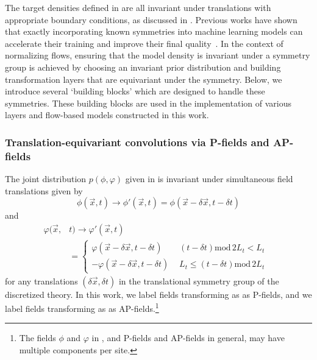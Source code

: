 \documentclass[aps,prd,twocolumn,nofootinbib,superscriptaddress,preprintnumbers]{revtex4-1}
\begin{document}
The target densities defined in  are all invariant under translations with appropriate boundary conditions, as discussed in . Previous works have shown that exactly incorporating known symmetries into machine learning models can accelerate their training and improve their final quality~\cite{cohen2016group,Cohen:2018,Cohen:2019,Tomiya:2021ywc,Bulusu:2021rqz,Favoni:2020reg}. In the context of normalizing flows, ensuring that the model density is invariant under a symmetry group is achieved by choosing an invariant prior distribution and building transformation layers that are equivariant under the symmetry.  Below, we introduce several `building blocks' which are designed to handle these symmetries. These building blocks are used in the implementation of various layers and flow-based models constructed in this work.


\subsubsection{Translation-equivariant convolutions via P-fields and AP-fields}
\label{sec:translational-sym}

The joint distribution $p(\phi,\varphi)$ given in  is invariant under simultaneous field translations given by
%
\begin{equation}
    \phi(\vec{x},t) \rightarrow \phi'(\vec{x},t) = \phi(\vec{x}-\delta\vec{x}, t-\delta t) \label{eq:P-field}
\end{equation}
%
and
%
\begin{equation}\label{eq:AP-field}
\begin{aligned}
    \varphi(\vec{x},&t) \rightarrow \varphi'(\vec{x},t) \\
    &= \begin{cases}
      \varphi(\vec{x}-\delta\vec{x}, t-\delta t) & \substack{(t-\delta t) \mathrm{mod} \, 2L_t < L_t} \\
    -\varphi(\vec{x}-\delta\vec{x}, t-\delta t) & \substack{L_t \leq (t - \delta t) \mathrm{mod} \, 2L_t}\ 
    \end{cases} 
\end{aligned}
\end{equation}
%
for any translations $(\delta \vec{x}, \delta t)$ in the translational symmetry group of the discretized theory. In this work, we label fields transforming as  as P-fields, and we label fields transforming as  as AP-fields.\footnote{The fields $\phi$ and $\varphi$ in , and P-fields and AP-fields in general, may have multiple components per site.}
\end{document}
